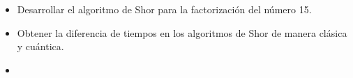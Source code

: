 \begin{itemize}
    \item Desarrollar el algoritmo de Shor para la factorización del número 15.
    \item Obtener la diferencia de tiempos en los algoritmos de Shor de manera clásica y cuántica.
    \item 
\end{itemize}
